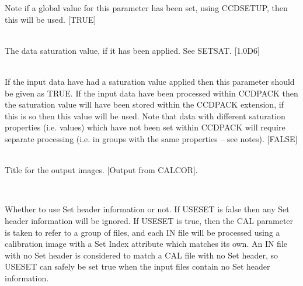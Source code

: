 \documentclass[twoside,11pt]{article}
\newcommand{\htmlref}[2]{#1}
\renewcommand{\_}{\texttt{\symbol{95}}}
\newcommand{\xroutine}[1]{\htmlref{{\sc #1}}{#1}}
\newcommand{\sstsubsection}[1]{ \item[{#1}] \mbox{} \\}
\newcommand{\sstsubsection}[1]{\item[{#1}]}
\begin{document}
{{{         Note if a global value for this parameter has been set, using
         \xroutine{CCDSETUP}, then this will be used.
         [TRUE]
      }
      \sstsubsection{
         SATURATION = \_DOUBLE (Read)
      } {
         The data saturation value, if it has been applied. See SETSAT.
         [1.0D6]
      }
      \sstsubsection{
         SETSAT = \_LOGICAL (Read)
      } {
         If the input data have had a saturation value applied then
         this parameter should be given as TRUE. If the input data
         have been processed within CCDPACK then the saturation value
         will have been stored within the CCDPACK extension, if this
         is so then this value will be used. Note that data with
         different saturation properties (i.e. values) which have not
         been set within CCDPACK will require separate processing
         (i.e. in groups with the same properties -- see notes).
         [FALSE]
      }
      \sstsubsection{
         TITLE = LITERAL (Read)
      } {
         Title for the output images.
         [Output from CALCOR].
      }
      \sstsubsection{
         USESET = \_LOGICAL (Read)
      } {
         Whether to use Set header information or not.  If USESET is
         false then any Set header information will be ignored.
         If USESET is true, then the CAL parameter is taken to
         refer to a group of files, and each IN file will be 
         processed using a calibration image with a Set Index 
         attribute which matches its own.  An IN file with no Set
         header is considered to match a CAL file with no Set header,
         so USESET can safely be set true when the 
         input files contain no Set header information.

}}}
\end{document}
